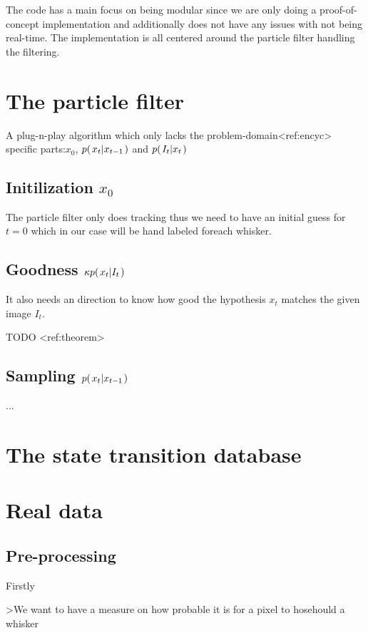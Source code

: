 
The code has a main focus on being modular since we are only doing a proof-of-concept implementation and additionally does not have any issues with not being real-time.
The implementation is all centered around the particle filter handling the filtering.

\section{The particle filter}
    A plug-n-play algorithm which only lacks the problem-domain<ref:encyc> specific parts:$x_0$, $p{(\left. x_t \middle\vert x_{t-1} \right.)}$ and $p{(\left. I_t \middle\vert x_t \right.)}$
    \subsection{Initilization $x_0$}
        The particle filter only does tracking thus we need to have an initial guess for $t=0$ which in our case will be hand labeled foreach whisker.
    \subsection{Goodness $\kappa p{(\left. x_t \middle\vert I_t \right.)}$}
        It also needs an direction to know how good the hypothesis $x_t$ matches the given image $I_t$.

        TODO <ref:theorem>
    \subsection{Sampling $p{(\left. x_t \middle\vert x_{t-1} \right.)}$}

        ...

\section{The state transition database}





\section{Real data}
    \subsection{Pre-processing}
    Firstly  

    >We want to have a measure on how probable it is for a pixel to hosehould a whisker





